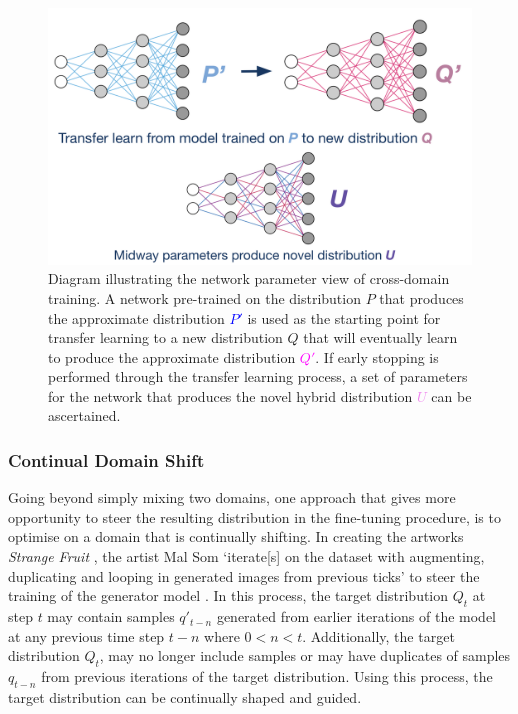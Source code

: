 \begin{figure}[!htbp]
    \centering
    \includegraphics[width=1\textwidth]{figures/c6_active_div/diagrams/cross_domain_training.png}
    \caption[Diagram illustrating the network parameter view of cross-domain training.]{Diagram illustrating the network parameter view of cross-domain training. A network pre-trained on the distribution $P$ that produces the approximate distribution \textcolor{blue}{$P'$} is used as the starting point for transfer learning to a new distribution $Q$ that will eventually learn to produce the approximate distribution \textcolor{magenta}{$Q'$}. If early stopping is performed through the transfer learning process, a set of parameters for the network that produces the novel hybrid distribution \textcolor{violet}{$U$} can be ascertained.}
  \label{fig:c6:cross-domain-training}
  \end{figure}

\subsubsection{Continual Domain Shift}
\label{section:domainshift}

Going beyond simply mixing two domains, one approach that gives more opportunity to steer the resulting distribution in the fine-tuning procedure, is to optimise on a domain that is continually shifting. In creating the artworks \textit{Strange Fruit} \citep{som2020strange}, the artist Mal Som `iterate[s] on the dataset with augmenting, duplicating and looping in generated images from previous ticks' to steer the training of the generator model \citep{som2021personal}. 
In this process, the target distribution $Q_t$ at step $t$ may contain samples $q'_{t-n}$ generated from earlier iterations of the model at any previous time step $t-n$ where $0<n<t$. 
Additionally, the target distribution $Q_t$, may no longer include samples or may have duplicates of samples $q_{t-n}$ from previous iterations of the target distribution. 
Using this process, the target distribution can be continually shaped and guided. 

